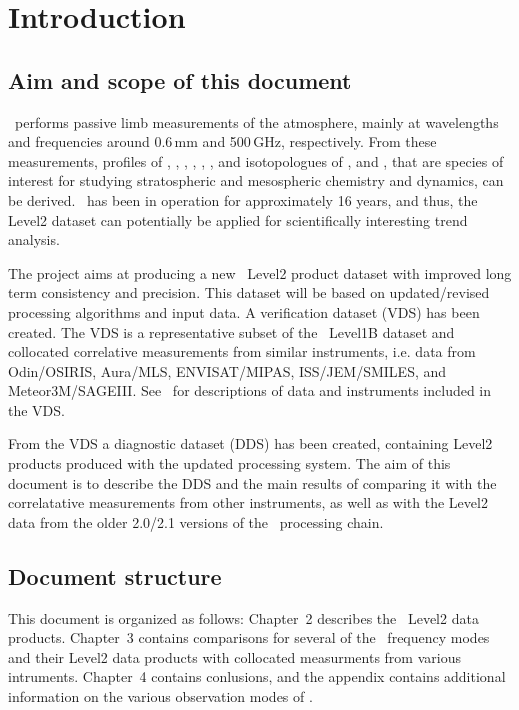 \chapter{Introduction}
\label{chapter:introduction}


\setcounter{page}{1}


\section{Aim and scope of this document}
\label{sec:aim}
\smr\ performs passive limb measurements of the atmosphere, mainly at
wavelengths and frequencies around 0.6\,mm and 500\,GHz, respectively.  From
these measurements, profiles of , , ,
, , , and isotopologues of ,
and , that are species of interest for studying
stratospheric and mesospheric chemistry and dynamics, can be derived.  \smr\
has been in operation for approximately 16 years, and thus, the Level2 dataset
can potentially be applied for scientifically interesting trend analysis.

The project aims at producing a  new \smr\ Level2 product dataset with improved
long term consistency and precision.   This dataset will be
based on updated/revised processing algorithms and input data.  A verification
dataset (VDS) has been created. The VDS is a representative subset of the \smr\
Level1B dataset and collocated correlative measurements from similar
instruments, i.e.  data from Odin/OSIRIS, Aura/MLS, ENVISAT/MIPAS,
ISS/JEM/SMILES, and Meteor3M/SAGEIII. See~\cite{VDS:2016} for descriptions of
data and instruments included in the VDS.

From the VDS a diagnostic dataset (DDS) has been created, containing Level2
products produced with the updated processing system. The aim of this document
is to describe the DDS and the main results of comparing it with the
correlatative measurements from other instruments, as well as with the Level2
data from the older 2.0/2.1 versions of the \smr\ processing chain.

\section{Document structure}
This document is organized as follows: Chapter~2 describes the \smr\ Level2
data products. Chapter~3 contains comparisons for several of the \smr\
frequency modes and their Level2 data products with collocated measurments from
various intruments. Chapter~4 contains conlusions, and the appendix contains
additional information on the various observation modes of \smr.
